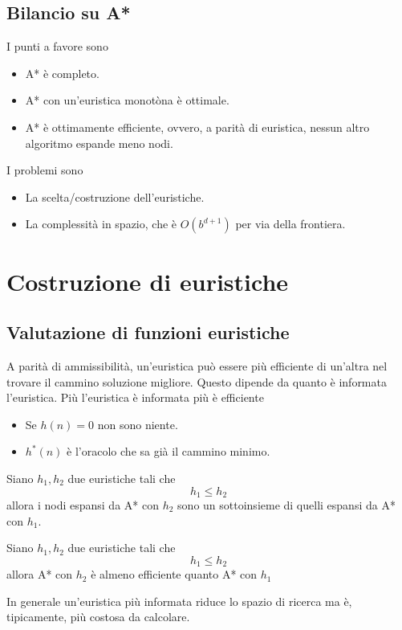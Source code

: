 \subsection{Bilancio su A*}
I punti a favore sono
\begin{itemize}
	\item A* \`e completo.
	\item A* con un'euristica monot\`ona \`e ottimale.
	\item A* \`e ottimamente efficiente, ovvero, a parit\`a di euristica, nessun altro algoritmo
	      espande meno nodi.
\end{itemize}
I problemi sono
\begin{itemize}
	\item La scelta/costruzione dell'euristiche.
	\item La complessit\`a in spazio, che \`e $O(b^{d+1})$ per via della frontiera.
\end{itemize}

\section{Costruzione di euristiche}
\subsection{Valutazione di funzioni euristiche}
A parit\`a di ammissibilit\`a, un'euristica pu\`o essere pi\`u efficiente di un'altra nel
trovare il cammino soluzione migliore. Questo dipende da quanto \`e informata l'euristica.
Pi\`u l'euristica \`e informata pi\`u \`e efficiente
\begin{itemize}
	\item Se $h(n) = 0$ non sono niente.
	\item $h^*(n)$ \`e l'oracolo che sa gi\`a il cammino minimo.
\end{itemize}

\begin{theorem}
	Siano $h_1, h_2$ due euristiche tali che \[ h_1 \leq h_2 \] allora i nodi espansi da
	A* con $h_2$ sono un sottoinsieme di quelli espansi da A* con $h_1$.
\end{theorem}

\begin{theorem}
	Siano $h_1, h_2$ due euristiche tali che \[ h_1 \leq h_2 \] allora A* con $h_2$ \`e
	almeno efficiente quanto A* con $h_1$
\end{theorem}
In generale un'euristica pi\`u informata riduce lo spazio di ricerca ma \`e, tipicamente,
pi\`u costosa da calcolare.

